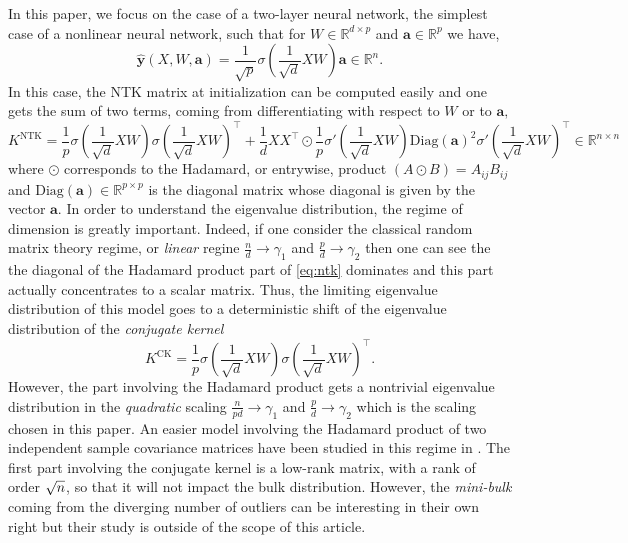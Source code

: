 \documentclass[letterpaper, 10pt, dvipsnames]{article}
\numberwithin{equation}{section}
\newcommand{\Rbb}{\mathbb{R}}
\newcommand{\y}{\mathbf{y}}
\renewcommand{\hat}{\widehat}
\let\O\relax
\newcommand{\O}[1]{\mathcal{O}\left(#1\right)}
\theoremstyle{definition}
\begin{document}
In this paper, we focus on the case of a two-layer neural network, the simplest case of a nonlinear neural network, such that for $W\in \Rbb^{d\times p}$ and $\mathbf{a}\in\Rbb^p$ we have,
\[
\hat{\y}(X,W,\mathbf{a}) = \frac{1}{\sqrt{p}}\sigma\left(\frac{1}{\sqrt{d}}XW\right)\mathbf{a}\in\Rbb^n.
\]
In this case, the NTK matrix at initialization can be computed easily and one gets the sum of two terms, coming from differentiating with respect to $W$ or to $\mathbf{a},$
\begin{equation}\label{eq:ntk}
K^{\mathrm{NTK}} = \frac{1}{p}\sigma\left(\frac{1}{\sqrt{d}}XW\right)\sigma\left(\frac{1}{\sqrt{d}}XW\right)^\top
 +
  \frac{1}{d}XX^\top\odot \frac{1}{p}\sigma'\left(\frac{1}{\sqrt{d}}XW\right)\mathrm{Diag}(\mathbf{a})^2\sigma'\left(\frac{1}{\sqrt{d}}XW\right)^\top \in\Rbb^{n\times n}
\end{equation}
where $\odot$ corresponds to the Hadamard, or entrywise, product $(A\odot B)=A_{ij}B_{ij}$ and $\mathrm{Diag}(\mathbf{a})\in\Rbb^{p\times p}$ is the diagonal matrix whose diagonal is given by the vector $\mathbf{a}.$ In order to understand the eigenvalue distribution, the regime of dimension is greatly important. Indeed, if one consider the classical random matrix theory regime, or \emph{linear} regine $\frac{n}{d}\to \gamma_1$ and $\frac{p}{d}\to \gamma_2$ then one can see the the diagonal of the Hadamard product part of \eqref{eq:ntk} dominates and this part actually concentrates to a scalar matrix. Thus, the limiting eigenvalue distribution of this model goes to a deterministic shift of the eigenvalue distribution of the \emph{conjugate kernel} \cites{adlam2020neural, fan2020spectra}
\begin{equation}\label{eq:ck}
K^{\mathrm{CK}}=\frac{1}{p}\sigma\left(\frac{1}{\sqrt{d}}XW\right)\sigma\left(\frac{1}{\sqrt{d}}XW\right)^\top.
\end{equation}
However, the part involving the Hadamard product gets a nontrivial eigenvalue distribution in the \emph{quadratic} scaling $\frac{n}{pd}\to \gamma_1$ and $\frac{p}{d}\to\gamma_2$ which is the scaling chosen in this paper. An easier model involving the Hadamard product of two independent sample covariance matrices have been studied in this regime in \cite{abou2025eigenvalue}. The first part involving the conjugate kernel is a low-rank matrix, with a rank of order $\O{\sqrt{n}}$, so that it will not impact the bulk distribution. However, the \emph{mini-bulk} coming from the diverging number of outliers can be interesting in their own right but their study is outside of the scope of this article. 
\end{document}
